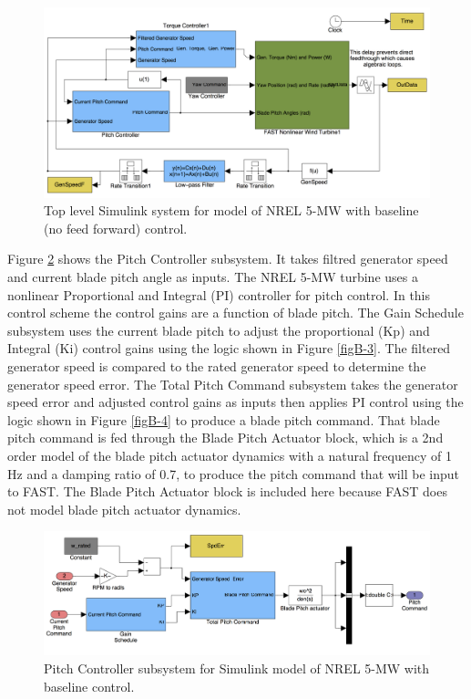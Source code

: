  \begin{figure}[ht]
	\centering
		\includegraphics[width=\linewidth]{Figures/AppendixBFigures/baseline1.png}
		
	\caption{Top level Simulink system for model of NREL 5-MW with baseline (no feed forward) control.}
	\label{figB-1}
\end{figure}

Figure \ref{figB-2} shows the Pitch Controller subsystem. It takes filtred generator speed and current blade pitch angle as inputs. The NREL 5-MW turbine uses a nonlinear Proportional and Integral (PI) controller for pitch control. In this control scheme the control gains are a function of blade pitch. The Gain Schedule subsystem uses the current blade pitch to adjust the proportional (Kp) and Integral (Ki) control gains using the logic shown in Figure \ref{figB-3}. The filtered generator speed is compared to the rated generator speed to determine the generator speed error. The Total Pitch Command subsystem takes the generator speed error and adjusted control gains as inputs then applies PI control using the logic shown in Figure \ref{figB-4} to produce a blade pitch command. That blade pitch command is fed through the Blade Pitch Actuator block, which is a 2nd order model of the blade pitch actuator dynamics with a natural frequency of 1 Hz and a damping ratio of 0.7, to produce the pitch command that will be input to FAST. The Blade Pitch Actuator block is included here because FAST does not model blade pitch actuator dynamics.

 \begin{figure}[ht]
	\centering
		\includegraphics[width=\linewidth]{Figures/AppendixBFigures/baseline2.png}
	\caption{Pitch Controller subsystem for Simulink model of NREL 5-MW with baseline control.}
	\label{figB-2}
\end{figure}

